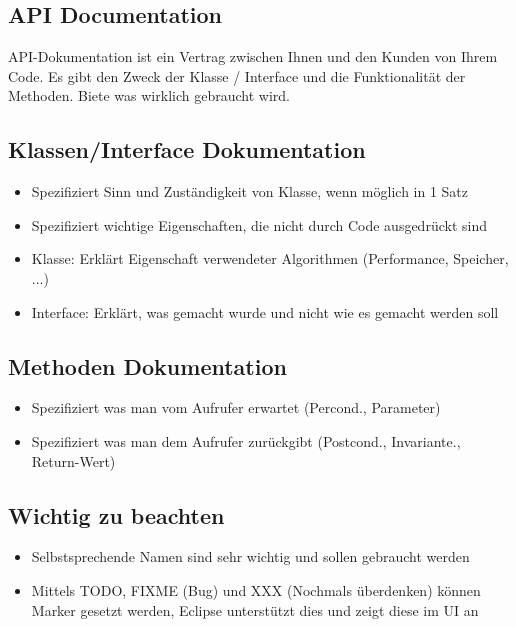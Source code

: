 \documentclass[a4paper,10pt]{article}
\begin{document}
\subsection{API Documentation}
API-Dokumentation ist ein Vertrag zwischen Ihnen und den Kunden von Ihrem Code. Es gibt den Zweck der Klasse / Interface und die Funktionalität der Methoden. Biete was wirklich gebraucht wird.

\subsection{Klassen/Interface Dokumentation}
\begin{itemize}
	\item Spezifiziert Sinn und Zuständigkeit von Klasse, wenn möglich in 1 Satz
	\item Spezifiziert wichtige Eigenschaften, die nicht durch Code ausgedrückt sind
	\item Klasse: Erklärt Eigenschaft verwendeter Algorithmen (Performance, Speicher, ...)
	\item Interface: Erklärt, was gemacht wurde und nicht wie es gemacht werden soll
\end{itemize}

\subsection{Methoden Dokumentation}
\begin{itemize}
	\item Spezifiziert was man vom Aufrufer erwartet (Percond., Parameter)
	\item Spezifiziert was man dem Aufrufer zurückgibt (Postcond., Invariante., Return-Wert)
\end{itemize}

\subsection{Wichtig zu beachten}
\begin{itemize}
\item Selbstsprechende Namen sind sehr wichtig und sollen gebraucht werden
\item Mittels TODO, FIXME (Bug) und XXX (Nochmals überdenken) können Marker gesetzt werden, Eclipse unterstützt dies und zeigt diese im UI an
\end{itemize}
\end{document}
